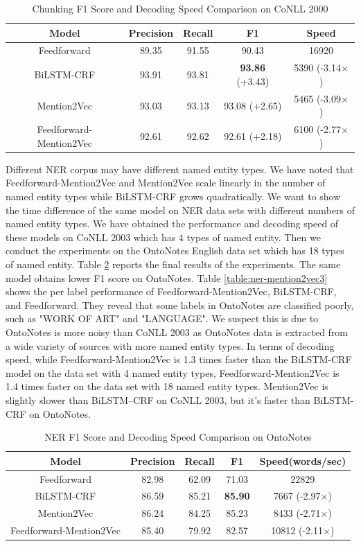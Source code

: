 \begin{table}[]
\centering
\caption{Chunking F1 Score and Decoding Speed Comparison on CoNLL 2000}
\label{table:chunk-mention2vec1}
\begin{tabular}{|c|c|c|c|c|}
\hline
Model   & Precision & Recall & F1 & Speed \\ \hline
Feedforward & 89.35 &91.55 &90.43 & 16920 \\ \hline
BiLSTM-CRF &93.91 &93.81 &\textbf{93.86} (+3.43) & 5390 (-3.14$\times$) \\ \hline
Mention2Vec &93.03 & 93.13 &93.08 (+2.65) & 5465 (-3.09$\times$) \\ \hline
Feedforward-Mention2Vec &92.61 & 92.62 &92.61 (+2.18) & 6100 (-2.77$\times$) \\ \hline
\end{tabular}
\end{table}


Different NER corpus may have different named entity types. We have noted that Feedforward-Mention2Vec and Mention2Vec scale linearly in the number of named entity types while BiLSTM-CRF grows quadratically. We want to show the time difference of the same model on NER data sets with different numbers of named entity types. We have obtained the performance and decoding speed of these models on CoNLL 2003 which has 4 types of named entity. Then we conduct the experiments on the OntoNotes English data set which has 18 types of named entity. Table \ref{table:ner-mention2vec2} reports the final results of the experiments. The same model obtains lower F1 score on OntoNotes. Table \ref{table:ner-mention2vec3} shows the per label performance of Feedforward-Mention2Vec, BiLSTM-CRF, and Feedforward. They reveal that some labels in OntoNotes are classified poorly, such as "WORK OF ART" and "LANGUAGE". We suspect this is due to OntoNotes is more noisy than CoNLL 2003 as OntoNotes data is extracted from a wide variety of sources with more named entity types. In terms of decoding speed, while Feedforward-Mention2Vec is 1.3 times faster than the BiLSTM-CRF model on the data set with 4 named entity types, Feedforward-Mention2Vec is 1.4 times faster on the data set with 18 named entity types. Mention2Vec is slightly slower than BiLSTM--CRF on CoNLL 2003, but it's faster than BiLSTM-CRF on OntoNotes.

\begin{table}[]
\centering
\caption{NER F1 Score and Decoding Speed Comparison on OntoNotes}
\label{table:ner-mention2vec2}
\begin{tabular}{|c|c|c|c|c|}
\hline
Model & Precision & Recall & F1 & Speed(words/sec) \\ \hline
Feedforward  & 82.98 & 62.09 & 71.03 & 22829 \\ \hline
BiLSTM-CRF &86.59 &85.21 &\textbf{85.90} & 7667 (-2.97$\times$)
  \\ \hline
Mention2Vec & 86.24 & 84.25 & 85.23 & 8433 (-2.71$\times$)
         \\ \hline
Feedforward-Mention2Vec & 85.40 & 79.92 & 82.57 & 10812 (-2.11$\times$) \\ \hline
\end{tabular}
\end{table}

